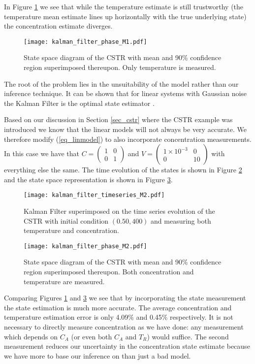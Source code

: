 In Figure \ref{fig_kfphase} we see that while the temperature estimate is still trustworthy (the temperature mean estimate lines up horizontally with the true underlying state) the concentration estimate diverges.
\begin{figure}[H] 
\centering
\texttt{[image: kalman\_filter\_phase\_M1.pdf]}
\caption{State space diagram of the CSTR with mean and 90\% confidence region superimposed thereupon. Only temperature is measured.}
\label{fig_kfphase}
\end{figure}
The root of the problem lies in the unsuitability of the model rather than our inference technique. It can be shown that for linear systems with Gaussian noise the Kalman Filter is the optimal state estimator \cite{shalom}. 

Based on our discussion in Section \ref{sec_cstr} where the CSTR example was introduced we know that the linear models will not always be very accurate. We therefore modify (\ref{eq_linmodel}) to also incorporate concentration measurements. In this case we have that $C = \begin{pmatrix}
1 & 0\\0 &1
\end{pmatrix}$ and $V = \begin{pmatrix}
1\times 10^{-3} & 0\\0 & 10
\end{pmatrix}$ with everything else the same. The time evolution of the states is shown in Figure \ref{fig_kftime2} and the state space representation is shown in Figure \ref{fig_kfphase2}. 
\begin{figure}[H] 
\centering
\texttt{[image: kalman\_filter\_timeseries\_M2.pdf]}
\caption{Kalman Filter superimposed on the time series evolution of the CSTR with initial condition $(0.50, 400)$ and measuring both temperature and concentration.}
\label{fig_kftime2}
\end{figure}
\begin{figure}[H] 
\centering
\texttt{[image: kalman\_filter\_phase\_M2.pdf]}
\caption{State space diagram of the CSTR with mean and 90\% confidence region superimposed thereupon. Both concentration and temperature are measured.}
\label{fig_kfphase2}
\end{figure}
Comparing Figures \ref{fig_kfphase} and \ref{fig_kfphase2} we see that by incorporating the state measurement the state estimation is much more accurate. The average concentration and temperature estimation error is only 4.09\% and 0.45\% respectively. It is not necessary to directly measure concentration as we have done: any measurement which depends on $C_A$ (or even both $C_A$ and $T_R$) would suffice. The second measurement reduces our uncertainty in the concentration state estimate because we have more to base our inference on than just a bad model.  
